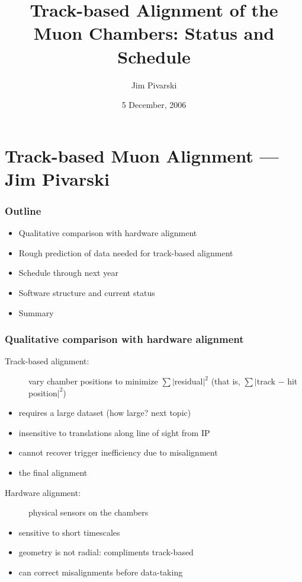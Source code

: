 \documentclass[compress]{beamer}
\title{Track-based Alignment of the Muon Chambers: Status and Schedule}
\author{Jim Pivarski}
\institute{Texas A\&M University}
\date{ 5 December, 2006}
\begin{document}
\frame{\titlepage}
\section*{Track-based Muon Alignment --- Jim Pivarski}

\begin{frame}
\frametitle{Outline}
\begin{itemize}\setlength{\itemsep}{0.65 cm}
\item Qualitative comparison with hardware alignment
\item Rough prediction of data needed for track-based alignment
\item Schedule through next year
\item Software structure and current status
\item Summary
\end{itemize}
\end{frame}

\begin{frame}
\frametitle{Qualitative comparison with hardware alignment}

\begin{description}
\item[Track-based alignment:] vary chamber positions to minimize $\sum |$residual$|^2$ (that is, $\sum |$track $-$ hit position$|^2$)
\end{description}
\begin{itemize}
\item<1-> requires a large dataset (how large? next topic)
\item<2-> insensitive to translations along line of sight from IP
\item<3-> cannot recover trigger inefficiency due to misalignment
\item<4-> the final alignment
\end{itemize}

\vfill
\begin{description}
\item[Hardware alignment:] physical sensors on the chambers
\end{description}
\begin{itemize}
\item<1-> sensitive to short timescales
\item<2-> geometry is not radial: compliments track-based
\item<3-> can correct misalignments before data-taking
\end{itemize}
\end{frame}
\end{document}
